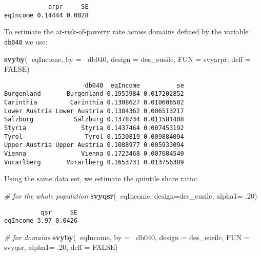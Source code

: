 \documentclass[]{book}
\newenvironment{Shaded}{\begin{snugshade}}{\end{snugshade}}
\newcommand{\CommentTok}[1]{\textcolor[rgb]{0.56,0.35,0.01}{\textit{#1}}}
\newcommand{\DataTypeTok}[1]{\textcolor[rgb]{0.13,0.29,0.53}{#1}}
\newcommand{\FloatTok}[1]{\textcolor[rgb]{0.00,0.00,0.81}{#1}}
\newcommand{\KeywordTok}[1]{\textcolor[rgb]{0.13,0.29,0.53}{\textbf{#1}}}
\newcommand{\NormalTok}[1]{#1}
\newcommand{\OperatorTok}[1]{\textcolor[rgb]{0.81,0.36,0.00}{\textbf{#1}}}
\newcommand{\OtherTok}[1]{\textcolor[rgb]{0.56,0.35,0.01}{#1}}
\begin{document}
\begin{verbatim}
            arpr     SE
eqIncome 0.14444 0.0028
\end{verbatim}

To estimate the at-risk-of-poverty rate across domains defined by the variable \texttt{db040} we use:

\begin{Shaded}
\begin{Highlighting}[]
\KeywordTok{svyby}\NormalTok{(}\OperatorTok{~}\NormalTok{eqIncome, }\DataTypeTok{by =} \OperatorTok{~}\NormalTok{db040, }\DataTypeTok{design =}\NormalTok{ des_eusilc, }\DataTypeTok{FUN =}\NormalTok{ svyarpr, }\DataTypeTok{deff =} \OtherTok{FALSE}\NormalTok{)}
\end{Highlighting}
\end{Shaded}

\begin{verbatim}
                      db040  eqIncome          se
Burgenland       Burgenland 0.1953984 0.017202852
Carinthia         Carinthia 0.1308627 0.010606502
Lower Austria Lower Austria 0.1384362 0.006513217
Salzburg           Salzburg 0.1378734 0.011581408
Styria               Styria 0.1437464 0.007453192
Tyrol                 Tyrol 0.1530819 0.009884094
Upper Austria Upper Austria 0.1088977 0.005933094
Vienna               Vienna 0.1723468 0.007684540
Vorarlberg       Vorarlberg 0.1653731 0.013756389
\end{verbatim}

Using the same data set, we estimate the quintile share ratio:

\begin{Shaded}
\begin{Highlighting}[]
\CommentTok{# for the whole population}
\KeywordTok{svyqsr}\NormalTok{(}\OperatorTok{~}\NormalTok{eqIncome, }\DataTypeTok{design=}\NormalTok{des_eusilc, }\DataTypeTok{alpha1=} \FloatTok{.20}\NormalTok{)}
\end{Highlighting}
\end{Shaded}

\begin{verbatim}
          qsr     SE
eqIncome 3.97 0.0426
\end{verbatim}

\begin{Shaded}
\begin{Highlighting}[]
\CommentTok{# for domains}
\KeywordTok{svyby}\NormalTok{(}\OperatorTok{~}\NormalTok{eqIncome, }\DataTypeTok{by =} \OperatorTok{~}\NormalTok{db040, }\DataTypeTok{design =}\NormalTok{ des_eusilc,}
      \DataTypeTok{FUN =}\NormalTok{ svyqsr, }\DataTypeTok{alpha1=} \FloatTok{.20}\NormalTok{, }\DataTypeTok{deff =} \OtherTok{FALSE}\NormalTok{)}
\end{Highlighting}
\end{Shaded}
\end{document}
